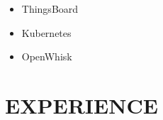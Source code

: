 \documentclass[10pt,a4paper,sans]{moderncv} %
\newcommand*{\authorimg}[1]{%
	\raisebox{-.3\baselineskip}{%
		\texttt{[image: \#1]}%
	}%
}
\begin{document}
\begin{cvcolumns}
	 {\begin{itemize}
	 		\vspace{0.1em}
	 		\setlength\itemsep{0.3em}
	 		\item \authorimg{pictures/thingsboard.png} ThingsBoard
	 		\item \authorimg{pictures/kubernetes.png} Kubernetes
	 		\item \authorimg{pictures/openwhisk.jpg} OpenWhisk
	 \end{itemize}}
 	
\end{cvcolumns}

\newpage

\section{EXPERIENCE}
\end{document}
